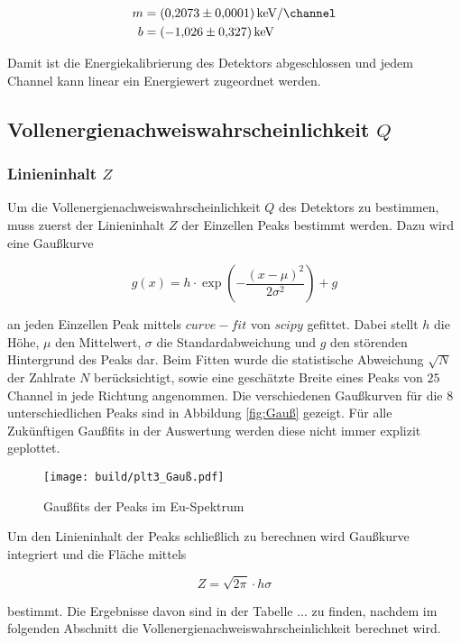 \begin{align*}
	m & =\qty[per-mode=fraction]{0.2073(0.0001)}{\kilo\eV\per\channel} \\
	b & =\qty{-1.026(0.327)}{\kilo\eV}
\end{align*}

Damit ist die Energiekalibrierung des Detektors abgeschlossen und jedem Channel
kann linear ein Energiewert zugeordnet werden.

\subsection{Vollenergienachweiswahrscheinlichkeit $Q$}
\subsubsection{Linieninhalt $Z$}
Um die Vollenergienachweiswahrscheinlichkeit $Q$ des Detektors zu bestimmen,
muss zuerst der Linieninhalt $Z$ der Einzellen Peaks bestimmt werden. Dazu wird
eine Gaußkurve

\begin{equation}
	g(x)=h\cdot \exp(-\frac{(x-\mu )^2}{2\sigma^2})+g
	\label{eq:Gauß}
\end{equation}

an jeden Einzellen Peak mittels $curve-fit$ von $scipy$ \cite{scipy} gefittet.
Dabei stellt $h$ die Höhe, $\mu$ den Mittelwert, $\sigma$ die
Standardabweichung und $g$ den störenden Hintergrund des Peaks dar. Beim Fitten
wurde die statistische Abweichung $\sqrt{N}$ der Zahlrate $N$ berücksichtigt,
sowie eine geschätzte Breite eines Peaks von $25$ Channel in jede Richtung
angenommen. Die verschiedenen Gaußkurven für die 8 unterschiedlichen Peaks sind
in Abbildung \eqref{fig:Gauß} gezeigt. Für alle Zukünftigen Gaußfits in der
Auswertung werden diese nicht immer explizit geplottet.

\begin{figure}
	\centering
	\texttt{[image: build/plt3\_Gauß.pdf]}
	\caption{Gaußfits der Peaks im Eu-Spektrum}
	\label{fig:Gauß}
\end{figure}

Um den Linieninhalt der Peaks schließlich zu berechnen wird Gaußkurve
integriert und die Fläche mittels

\begin{equation}
	Z=\sqrt{2\pi}\cdot h\sigma
	\label{eq:Z}
\end{equation}

bestimmt. Die Ergebnisse davon sind in der Tabelle ... zu finden, nachdem im
folgenden Abschnitt die Vollenergienachweiswahrscheinlichkeit berechnet wird.

